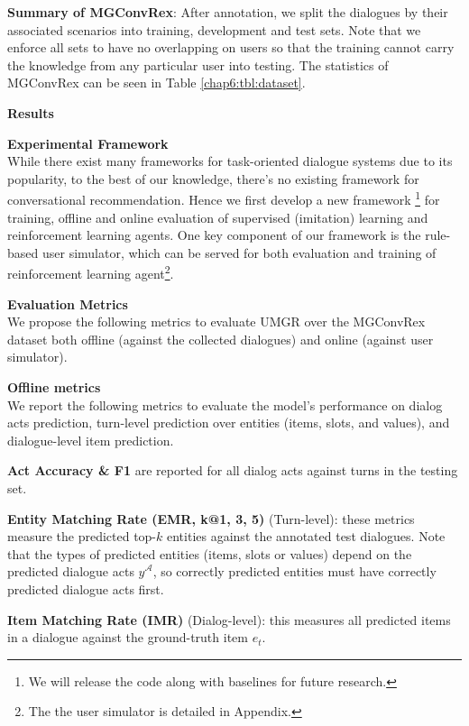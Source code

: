 \noindent \textbf{Summary of \textbf{MGConvRex}}:
\label{sec:dataset_stat}
After annotation, we split the dialogues by their associated scenarios into training, development and test sets.
Note that we enforce all sets to have no overlapping on users so that the training cannot carry the knowledge from any particular user into testing.
The statistics of MGConvRex can be seen in Table \ref{chap6:tbl:dataset}.

\textbf{Results}\\
\label{chap6:sec:exp}

\textbf{Experimental Framework}\\
While there exist many frameworks for task-oriented dialogue systems \cite{li2016user,li2018microsoft,lee2019convlab} due to its popularity,
to the best of our knowledge, there's no existing framework for conversational recommendation.
Hence we first develop a new framework  \footnote{We will release the code along with baselines for future research.} for training, offline and online evaluation of supervised (imitation) learning and reinforcement learning agents.
One key component of our framework is the rule-based user simulator, which can be served for both evaluation and training of reinforcement learning agent\footnote{The the user simulator is detailed in Appendix.}.

\textbf{Evaluation Metrics}\\
We propose the following metrics to evaluate UMGR over the MGConvRex dataset both offline (against the collected dialogues) and online (against user simulator).

\textbf{Offline metrics}\\
We report the following metrics to evaluate the model's performance on dialog acts prediction, turn-level prediction over entities (items, slots, and values), and dialogue-level item prediction.

\noindent \textbf{Act Accuracy \& F1} are reported for all dialog acts against turns in the testing set.

\noindent \textbf{Entity Matching Rate (EMR, k@1, 3, 5)} (Turn-level): these metrics measure the predicted top-$k$ entities against the annotated test dialogues. 
Note that the types of predicted entities (items, slots or values) depend on the predicted dialogue acts $\hat{y}^\mathcal{A}$, so correctly predicted entities must have correctly predicted dialogue acts first.

\noindent \textbf{Item Matching Rate (IMR)} (Dialog-level): this measures all predicted items in a dialogue against the ground-truth item $e_t$.

